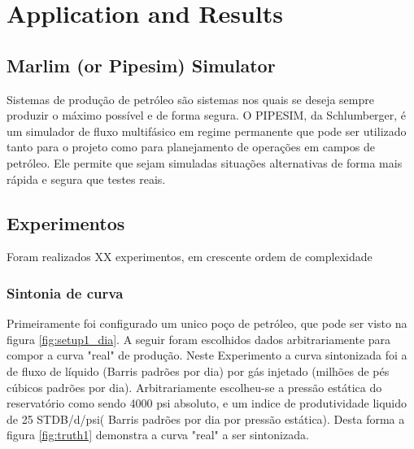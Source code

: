
\chapter{Application and Results} \label{chap:4}


\section{Marlim (or Pipesim) Simulator}
Sistemas de produção de petróleo são sistemas nos quais se deseja sempre produzir o máximo possível e de forma segura.
O PIPESIM, da Schlumberger, é um simulador de fluxo multifásico em regime permanente que pode ser utilizado tanto para o projeto como para planejamento de operações em campos de petróleo. Ele permite que sejam simuladas situações alternativas de forma mais rápida e segura que testes reais.



\section{Experimentos}
Foram realizados XX experimentos, em crescente ordem de complexidade

\subsection{Sintonia de curva }
Primeiramente foi configurado um unico poço de petróleo, que pode ser visto na figura \ref{fig:setup1_dia}. A seguir foram escolhidos dados arbitrariamente para compor a curva "real" de produção.
Neste Experimento a curva sintonizada foi a de fluxo de líquido (Barris padrões por dia) por gás injetado (milhões de pés cúbicos padrões por dia). Arbitrariamente escolheu-se a pressão estática do reservatório como sendo 4000 psi absoluto, e um indice de produtividade liquido de 25 STDB/d/psi( Barris padrões por dia por pressão estática). Desta forma a figura \ref{fig:truth1} demonstra a curva "real" a ser sintonizada.

